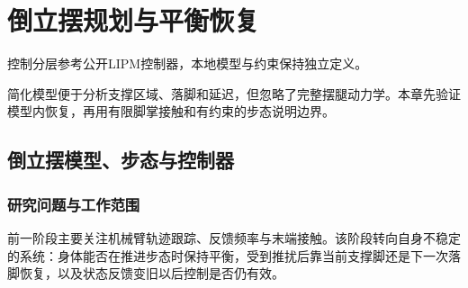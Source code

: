 \chapter{倒立摆规划与平衡恢复}
控制分层参考公开LIPM控制器\cite{lipm}，本地模型与约束保持独立定义。


简化模型便于分析支撑区域、落脚和延迟，但忽略了完整摆腿动力学。本章先验证模型内恢复，再用有限脚掌接触和有约束的步态说明边界。

\section{倒立摆模型、步态与控制器}

\label{stage:s17}

\subsection{研究问题与工作范围}\label{s17-detail-1}

前一阶段主要关注机械臂轨迹跟踪、反馈频率与末端接触。该阶段转向自身不稳定的系统：身体能否在推进步态时保持平衡，受到推扰后靠当前支撑脚还是下一次落脚恢复，以及状态反馈变旧以后控制是否仍有效。

